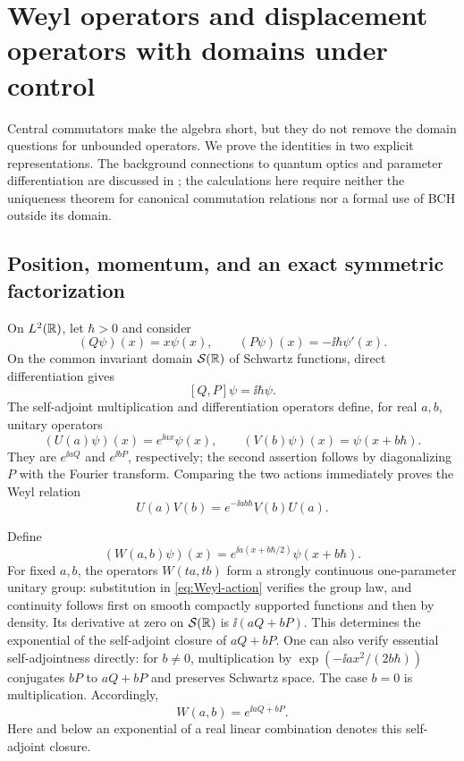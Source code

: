 \section{Weyl operators and displacement operators with domains under control}\label{sec:quantum}
Central commutators make the algebra short, but they do not remove the domain questions for unbounded operators. We prove the identities in two explicit representations. The background connections to quantum optics and parameter differentiation are discussed in \cite{Glauber,Wilcox}; the calculations here require neither the uniqueness theorem for canonical commutation relations nor a formal use of BCH outside its domain.

\subsection{Position, momentum, and an exact symmetric factorization}
On $L^2(\mathbb R)$, let $\hbar>0$ and consider
\begin{equation}
 (Q\psi)(x)=x\psi(x),\qquad (P\psi)(x)=-\ii\hbar\psi'(x).
\end{equation}
On the common invariant domain $\mathcal S(\mathbb R)$ of Schwartz functions, direct differentiation gives
\begin{equation}\label{eq:CCR}
 [Q,P]\psi=\ii\hbar\psi.
\end{equation}
The self-adjoint multiplication and differentiation operators define, for real $a,b$, unitary operators
\begin{equation}\label{eq:UV-actions}
 (U(a)\psi)(x)=e^{\ii ax}\psi(x),\qquad
 (V(b)\psi)(x)=\psi(x+b\hbar).
\end{equation}
They are $e^{\ii aQ}$ and $e^{\ii bP}$, respectively; the second assertion follows by diagonalizing $P$ with the Fourier transform. Comparing the two actions immediately proves the Weyl relation
\begin{equation}\label{eq:Weyl-braid}
 U(a)V(b)=e^{-\ii ab\hbar}V(b)U(a).
\end{equation}

Define
\begin{equation}\label{eq:Weyl-action}
 (W(a,b)\psi)(x)=e^{\ii a(x+b\hbar/2)}\psi(x+b\hbar).
\end{equation}
For fixed $a,b$, the operators $W(ta,tb)$ form a strongly continuous one-parameter unitary group: substitution in \cref{eq:Weyl-action} verifies the group law, and continuity follows first on smooth compactly supported functions and then by density. Its derivative at zero on $\mathcal S(\mathbb R)$ is $\ii(aQ+bP)$. This determines the exponential of the self-adjoint closure of $aQ+bP$. One can also verify essential self-adjointness directly: for $b\ne0$, multiplication by
$\exp(-\ii ax^2/(2b\hbar))$ conjugates $bP$ to $aQ+bP$ and preserves Schwartz space. The case $b=0$ is multiplication. Accordingly,
\begin{equation}\label{eq:W-is-exp}
 W(a,b)=e^{\ii\overline{aQ+bP}}.
\end{equation}
Here and below an exponential of a real linear combination denotes this self-adjoint closure.

